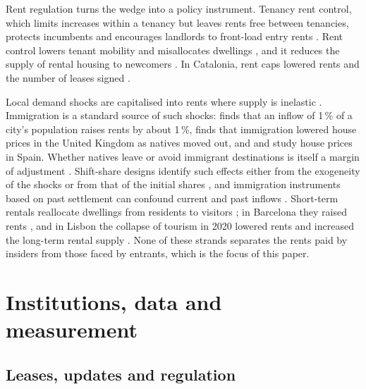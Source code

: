 \documentclass[11pt,a4paper]{article}
\begin{document}
Rent regulation turns the wedge into a policy instrument. Tenancy rent control, which limits increases within a tenancy but leaves rents free between tenancies, protects incumbents and encourages landlords to front-load entry rents \citep{arnott1995,basu2000}. Rent control lowers tenant mobility and misallocates dwellings \citep{glaeser2003,sims2007,diamond2019}, and it reduces the supply of rental housing to newcomers \citep{autor2014,diamond2019,kholodilin2024}. In Catalonia, rent caps lowered rents and the number of leases signed \citep{jofre2023,monras2023,perez2026}.

Local demand shocks are capitalised into rents where supply is inelastic \citep{roback1982,saiz2010,glaeser2018,hilber2016,hsieh2019}. Immigration is a standard source of such shocks: \citet{saiz2007} finds that an inflow of 1\,\% of a city's population raises rents by about 1\,\%, \citet{sa2015} finds that immigration lowered house prices in the United Kingdom as natives moved out, and \citet{gonzalez2013} and \citet{sanchis2023} study house prices in Spain. Whether natives leave or avoid immigrant destinations is itself a margin of adjustment \citep{card2001,saiz2011}. Shift-share designs identify such effects either from the exogeneity of the shocks \citep{borusyak2022,adao2019,borusyak2023} or from that of the initial shares \citep{goldsmith2020}, and immigration instruments based on past settlement can confound current and past inflows \citep{jaeger2018}. Short-term rentals reallocate dwellings from residents to visitors \citep{barron2021}; in Barcelona they raised rents \citep{garcialopez2020}, and in Lisbon the collapse of tourism in 2020 lowered rents and increased the long-term rental supply \citep{batalha2022}. None of these strands separates the rents paid by insiders from those faced by entrants, which is the focus of this paper.

\section{Institutions, data and measurement}\label{sec:data}

\subsection{Leases, updates and regulation}
\end{document}
